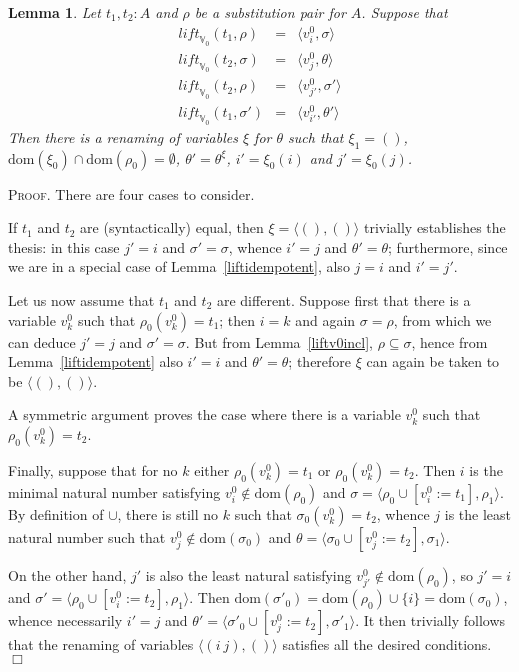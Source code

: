 \documentclass{article}
\newtheorem{lemma}[definition]{Lemma}
\newenvironment{proof}{\smallskip\textsc{Proof.}}{\hspace*{\fill}$\Box$}
\newcommand{\V}{{\mathbb V}}
\newcommand{\liftv}[1]{\ensuremath{\mathit{lift}_{\V_{#1}}}}
\newcommand{\dom}{\ensuremath{\mathrm{dom}}}
\newcommand{\renamevar}[2]{\ensuremath{{#1}^{#2}}}
\newcommand{\isrenamevar}[3]{\ensuremath{{#1}=\renamevar{#2}{#3}}}
\newcommand{\idn}{()}
\begin{document}
\begin{lemma}\label{liftv0commv0}
Let $t_1,t_2:A$ and $\rho$ be a substitution pair for $A$.
Suppose that
\begin{eqnarray*}
\liftv0(t_1,\rho) & = & \langle v^0_i,\sigma\rangle\\
\liftv0(t_2,\sigma) & = & \langle v^0_j,\theta\rangle\\
\liftv0(t_2,\rho) & = & \langle v^0_{j'},\sigma'\rangle\\
\liftv0(t_1,\sigma') & = & \langle v^0_{i'},\theta'\rangle
\end{eqnarray*}
Then there is a renaming of variables $\xi$ for $\theta$ such that
$\xi_1=\idn$, $\dom(\xi_0)\cap\dom(\rho_0)=\emptyset$,
{\isrenamevar{\theta'}\theta\xi}, $i'=\xi_0(i)$ and $j'=\xi_0(j)$.
\end{lemma}
\begin{proof}
There are four cases to consider.

If $t_1$ and $t_2$ are (syntactically) equal, then
$\xi=\langle\idn,\idn\rangle$ trivially establishes the thesis: in this
case $j'=i$ and $\sigma'=\sigma$, whence $i'=j$ and $\theta'=\theta$;
furthermore, since we are in a special case of Lemma~\ref{liftidempotent},
also $j=i$ and $i'=j'$.

Let us now assume that $t_1$ and $t_2$ are different.
Suppose first that there is a variable $v^0_k$ such that
$\rho_0(v^0_k)=t_1$; then $i=k$ and again $\sigma=\rho$, from
which we can deduce $j'=j$ and $\sigma'=\sigma$.  But from
Lemma~\ref{liftv0incl}, $\rho\subseteq\sigma$, hence from
Lemma~\ref{liftidempotent} also $i'=i$ and $\theta'=\theta$;
therefore $\xi$ can again be taken to be
$\langle\idn,\idn\rangle$.

A symmetric argument proves the case where there is a variable $v^0_k$
such that $\rho_0(v^0_k)=t_2$.

Finally, suppose that for no $k$ either $\rho_0(v^0_k)=t_1$ or
$\rho_0(v^0_k)=t_2$.  Then $i$ is the minimal natural number satisfying
$v^0_i\not\in\dom(\rho_0)$ and
$\sigma=\langle\rho_0\cup[v^0_i:=t_1],\rho_1\rangle$.  By definition
of $\cup$, there is still no $k$ such that $\sigma_0(v^0_k)=t_2$,
whence $j$ is the least natural number such that $v^0_j\not\in\dom(\sigma_0)$
and $\theta=\langle\sigma_0\cup[v^0_j:=t_2],\sigma_1\rangle$.

On the other hand, $j'$ is also the least natural satisfying
$v^0_{j'}\not\in\dom(\rho_0)$, so $j'=i$ and
$\sigma'=\langle\rho_0\cup[v^0_i:=t_2],\rho_1\rangle$.  Then
$\dom(\sigma'_0)=\dom(\rho_0)\cup\{i\}=\dom(\sigma_0)$, whence
necessarily $i'=j$ and
$\theta'=\langle\sigma'_0\cup[v^0_j:=t_2],\sigma'_1\rangle$.
It then trivially follows that the renaming of variables
$\langle(i\ j),\idn\rangle$ satisfies all the desired conditions.
\end{proof}
\end{document}
